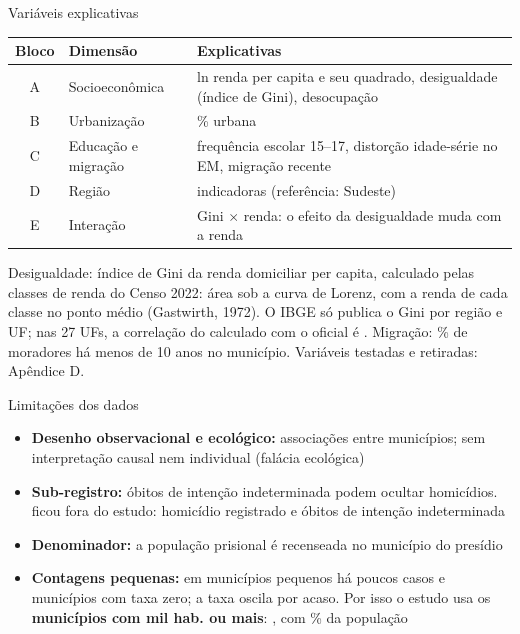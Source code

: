 \documentclass[aspectratio=169,11pt,xcolor=table]{beamer}
\begin{document}
\begin{frame}{Variáveis explicativas}
\footnotesize
\renewcommand{\arraystretch}{1.2}
\begin{tabularx}{\textwidth}{@{}cl>{\raggedright\arraybackslash}X@{}}
\toprule
\textbf{Bloco} & \textbf{Dimensão} & \textbf{Explicativas}\\
\midrule
A & Socioeconômica & ln renda per capita e seu quadrado, desigualdade (índice de Gini), desocupação\\
B & Urbanização & \% urbana\\
C & Educação e migração & frequência escolar 15--17, distorção idade-série no EM, migração recente\\
D & Região & \nNumReg{} indicadoras (referência: Sudeste)\\
E & Interação & Gini $\times$ renda: o efeito da desigualdade muda com a renda\\
\bottomrule
\end{tabularx}
\vspace{0.6em}

{\scriptsize\color{black!70}Desigualdade: índice de Gini da renda domiciliar per capita, calculado pelas classes de renda do Censo 2022: área sob a curva de Lorenz, com a renda de cada classe no ponto médio (Gastwirth, 1972). O IBGE só publica o Gini por região e UF; nas 27 UFs, a correlação do calculado com o oficial é \nGiniCorUF. Migração: \% de moradores há menos de 10 anos no município. Variáveis testadas e retiradas: Apêndice D.}
\end{frame}

\begin{frame}{Limitações dos dados}
\begin{itemize}
\setlength{\itemsep}{0.45em}
\item \textbf{Desenho observacional e ecológico:} associações entre municípios; sem interpretação causal nem individual (falácia ecológica)
\item \textbf{Sub-registro:} óbitos de intenção indeterminada podem ocultar homicídios. \nForaNome{} ficou fora do estudo: \nForaHom{} homicídio registrado e \nForaIndet{} óbitos de intenção indeterminada
\item \textbf{Denominador:} a população prisional é recenseada no município do presídio
\item \textbf{Contagens pequenas:} em municípios pequenos há poucos casos e \nZerosBR{} municípios com taxa zero; a taxa oscila por acaso. Por isso o estudo usa os \textbf{municípios com \nPopMin{} mil hab. ou mais}: \nMunEsc, com \nPctPopEsc\% da população
\end{itemize}
\end{frame}
\end{document}
